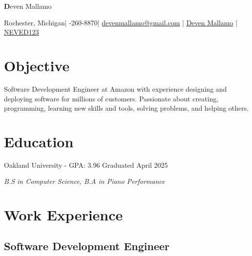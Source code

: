 \documentclass{article}
\makeatletter
\newcommand{\resumesection}[1]{
	\section*{\Large\textbf{#1}}
	\hrulefill
	\vspace{1ex}
}
\newcommand{\name}{Deven Mallamo}
\newcommand{\address}{Rochester, \hspace{49152sp}Michigan}
\newcommand{\phone}{586-260-8870}
\newcommand{\email}{devenmallamo@gmail.com}
\newcommand{\linkedin}{Deven Mallamo}
\newcommand{\github}{NEVED123}
\makeatother
\begin{document}
\begin{tcolorbox}[colback= boxfill,colframe=boxframe]
	\begin{center}
		\vspace{5pt}
		\Huge \textbf \name

		\normalsize \vspace{10pt}

		\faHome \space \address \space | 
		\space \faPhone \space \phone \space \space |
		\space \href{mailto:\email}{\faEnvelope \space \email} \space | 
		\href{https://www.linkedin.com/in/deven-mallamo/}{\space \faLinkedin \space \linkedin} \space | 
		\href{https://github.com/NEVED123}{\space \faGithub \space \github} 
	\end{center}
\end{tcolorbox}

\vspace{1ex}

\resumesection{Objective}

\vspace{.2ex}	

Software Development Engineer at Amazon with experience designing and deploying software for millions of customers. Passionate about creating, programming, learning new skills and tools, solving problems, and helping others.

\vspace{.5ex}	


\resumesection{Education}

\vspace{.2ex}	

Oakland University - GPA: 3.96 \hfill Graduated April 2025

\textit {B.S in Computer Science, B.\hspace{49152sp}A in Piano Performance} 

\vspace{.5ex}


\resumesection{Work Experience}

\subsection*{Software Development Engineer} 
\end{document}
